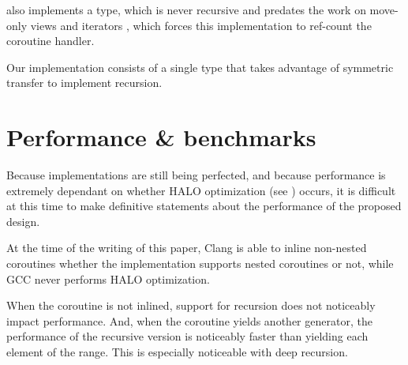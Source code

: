 \documentclass{wg21}
\begin{document}
 also implements a  type, which is never recursive and predates the work on move-only views and
iterators \cite{P1456R1}, \cite{P1207R0} which forces this implementation to ref-count the coroutine handler.

Our implementation \cite{Implementation} consists of a single type that takes advantage of symmetric transfer to implement
recursion.

\section{Performance \& benchmarks}

Because implementations are still being perfected, and because performance is extremely dependant on whether HALO optimization (see )
occurs, it is difficult at this time to make definitive statements about the performance of the proposed design.

At the time of the writing of this paper, Clang is able to inline non-nested coroutines whether the implementation
supports nested coroutines or not, while GCC never performs HALO optimization.

When the coroutine is not inlined, support for recursion does not noticeably impact performance.
And, when the coroutine yields another generator, the performance of the recursive version is noticeably faster than
yielding each element of the range. This is especially noticeable with deep recursion.

\end{document}
